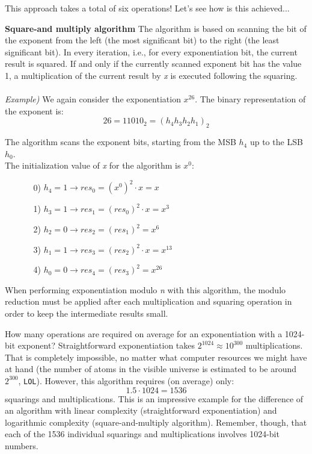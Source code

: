 This approach takes a total of six operations! Let's see how is this achieved...
\begin{framed}
    \hfill\break\textbf{Square-and multiply algorithm} The algorithm is based on scanning the bit of the exponent from the left (the most significant bit) to the right (the least significant bit). In every iteration, i.e., for every exponentiation bit, the current result is squared. If and only if the currently scanned exponent bit has the value 1, a multiplication of the current result by \textit{x} is executed following the squaring.\\\\
\textit{Example)} We again consider the exponentiation $x^{26}$. The binary representation of the exponent \nolinebreak is:
$$26=11010_2=(h_4h_3h_2h_1)_2$$

The algorithm scans the exponent bits, starting from the MSB $h_4$ up to the LSB $h_0$.\\

The initialization value of \textit{x} for the algorithm is $x^0$:
\begin{itemize}
    \item[]\begin{enumerate}
        \item[0)] $h_4=1\rightarrow res_0=(x^0)^2\cdot x=x$
        \item[1)] $h_3=1\rightarrow res_1=(res_0)^2\cdot x = x^3$
        \item[2)] $h_2=0\rightarrow res_2=(res_1)^2=x^6$
        \item[3)] $h_1=1\rightarrow res_3=(res_2)^2\cdot x=x^{13}$
        \item[4)] $h_0=0\rightarrow res_4=(res_3)^2=x^{26}$
    \end{enumerate}
\end{itemize}
When performing exponentiation modulo \textit{n} with this algorithm, the modulo reduction must be applied after each multiplication and squaring operation in order to keep the intermediate results small.
\end{framed}
How many operations are required on average for an exponentiation with a 1024-bit exponent? Straightforward exponentiation takes $2^{1024}\approx10^{300}$ multiplications. That is completely impossible, no matter what computer resources we might have at hand  (the number of atoms in the visible universe is estimated to be around $2^{300}$, \texttt{LOL}). However, this algorithm requires (on average) only:
$$1.5\cdot1024=1536$$
squarings and multiplications. This is an impressive example for the difference of an algorithm with linear complexity (straightforward exponentiation) and logarithmic complexity (square-and-multiply algorithm). Remember, though, that each of the 1536 individual squarings and multiplications involves 1024-bit numbers.

